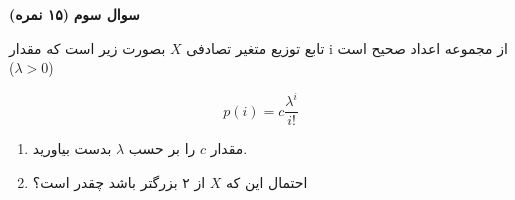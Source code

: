 \Large \textbf{سوال سوم}
\Large \textbf{(۱۵ نمره)}

\normalsize \vspace{0.5cm}

تابع توزیع متغیر تصادفی
$X$
بصورت زیر
است
که مقدار i از مجموعه اعداد صحیح است ($\lambda > 0 $)

$$p(i)= c \frac{\lambda^i}{i!}$$ 

\begin{enumerate}
	\item مقدار 
	$c$
	را بر حسب 
	$\lambda$
	بدست بیاورید.
	\item احتمال این که $X$ از ۲ بزرگتر باشد چقدر است؟
\end{enumerate}

